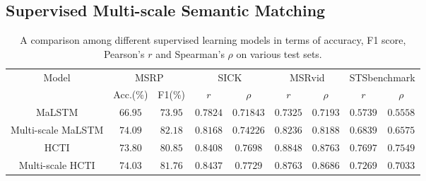 
\subsection{Supervised Multi-scale Semantic Matching}
\label{subsec:eval-multilayer}

\begin{table*}[tb]
  \caption{A comparison among different supervised learning models in terms of accuracy, F1 score, Pearson's $r$ and Spearman's $\rho$ on various test sets.}
  \label{tab:sts}
  \begin{tabular}{c|cc|cc|cc|cc}
    \toprule
    \multirow{2}{*}{Model} & \multicolumn{2}{c}{MSRP} & \multicolumn{2}{c}{SICK} & \multicolumn{2}{c}{MSRvid} & \multicolumn{2}{c}{STSbenchmark}\\ 
     & Acc.(\%) & F1(\%) & $r$ & $\rho$ & $r$ & $\rho$ & $r$ & $\rho$ \\
    \midrule
    MaLSTM & $66.95$ & $73.95$ & $0.7824$ & $0.71843$ & $0.7325$ & $0.7193$ & $0.5739$ & $0.5558$\\
    Multi-scale MaLSTM & $\mathbf{74.09}$ & $\mathbf{82.18}$ & $\mathbf{0.8168}$ & $\mathbf{0.74226}$ & $\mathbf{0.8236}$ & $\mathbf{0.8188}$ & $\mathbf{0.6839}$ & $\mathbf{0.6575}$\\
    \midrule
    HCTI & $73.80$ & $80.85$ & $0.8408$ & $0.7698$ & $\mathbf{0.8848}$ & $\mathbf{0.8763}$  & $\mathbf{0.7697}$ & $\mathbf{0.7549}$ \\
    Multi-scale HCTI & $\mathbf{74.03}$ & $\mathbf{81.76}$ & $\mathbf{0.8437}$ & $\mathbf{0.7729}$ & $0.8763$ & $0.8686$  & $0.7269$ & $0.7033$  \\
    \bottomrule
  \end{tabular}
  \vspace{-2mm}
\end{table*}


